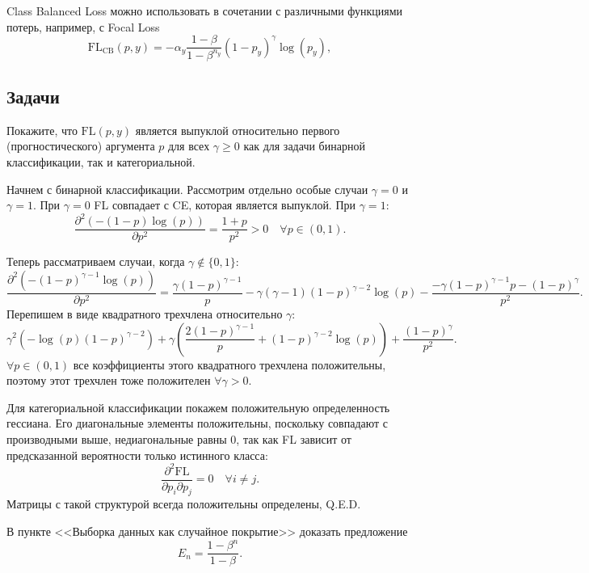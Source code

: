 \begin{remark}
    Class Balanced Loss можно использовать в сочетании с различными функциями потерь, например, с Focal Loss
    \[
        \text{FL}_\text{CB}(p,y)=-\alpha_y\dfrac{1-\beta}{1-\beta^{n_y}}(1-p_y)^\gamma\log(p_y),
    \]
\end{remark}

\subsection*{Задачи}

\begin{problem}
    Покажите, что $\text{FL}(p,y)$ является выпуклой относительно первого (прогностического) аргумента $p$ для всех $\gamma \ge 0$ как для задачи бинарной классификации, так и категориальной.
\end{problem}

\begin{solution}
    Начнем с бинарной классификации. Рассмотрим отдельно особые случаи $\gamma=0$ и $\gamma=1$. При $\gamma=0$ FL совпадает с CE, которая является выпуклой. При $\gamma=1$:
    \[
        \dfrac{\partial^2\left(-(1-p)\log(p)\right)}{\partial p^2}=\dfrac{1+p}{p^2}>0 \quad \forall p \in (0,1).
    \]
    
    Теперь рассматриваем случаи, когда $\gamma\notin\{0,1\}$:
    \[
        \dfrac{\partial^2\left(-(1-p)^{\gamma-1}\log(p)\right)}{\partial p^2}=\dfrac{\gamma(1-p)^{\gamma-1}}{p}-\gamma(\gamma-1)(1-p)^{\gamma-2}\log(p)-\dfrac{-\gamma(1-p)^{\gamma-1}p-(1-p)^\gamma}{p^2}.
    \]
    Перепишем в виде квадратного трехчлена относительно $\gamma$:
    \[
        \gamma^2\left(-\log(p)(1-p)^{\gamma-2}\right)+\gamma\left(\dfrac{2(1-p)^{\gamma-1}}{p}+(1-p)^{\gamma-2}\log(p)\right)+\dfrac{(1-p)^\gamma}{p^2}.
    \]
    $\forall p \in (0,1)$ все коэффициенты этого квадратного трехчлена положительны, поэтому этот трехчлен тоже положителен $\forall \gamma>0$.

    Для категориальной классификации покажем положительную определенность гессиана. Его диагональные элементы положительны, поскольку совпадают с производными выше, недиагональные равны 0, так как FL зависит от предсказанной вероятности только истинного класса:
    \[
        \dfrac{\partial^2\text{FL}}{\partial p_i \partial p_j}=0 \quad \forall i \neq j.
    \]
    Матрицы с такой структурой всегда положительны определены, Q.E.D.
\end{solution}

\begin{problem}
    В пункте <<Выборка данных как случайное покрытие>>  доказать предложение
    \[
        E_n=\dfrac{1-\beta^n}{1-\beta}.
    \]
\end{problem}

